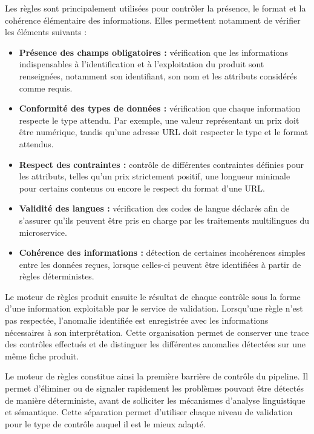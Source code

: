 Les règles sont principalement utilisées pour contrôler la présence, le format et la cohérence élémentaire des informations. Elles permettent notamment de vérifier les éléments suivants :
\newpage
\begin{itemize}
    \item \textbf{Présence des champs obligatoires :} vérification que les informations indispensables à l'identification et à l'exploitation du produit sont renseignées, notamment son identifiant, son nom et les attributs considérés comme requis.

    \item \textbf{Conformité des types de données :} vérification que chaque information respecte le type attendu. Par exemple, une valeur représentant un prix doit être numérique, tandis qu'une adresse URL doit respecter le type et le format attendus.

    \item \textbf{Respect des contraintes :} contrôle de différentes contraintes définies pour les attributs, telles qu'un prix strictement positif, une longueur minimale pour certains contenus ou encore le respect du format d'une URL.

    \item \textbf{Validité des langues :} vérification des codes de langue déclarés afin de s'assurer qu'ils peuvent être pris en charge par les traitements multilingues du microservice.

    \item \textbf{Cohérence des informations :} détection de certaines incohérences simples entre les données reçues, lorsque celles-ci peuvent être identifiées à partir de règles déterministes.
\end{itemize}

Le moteur de règles produit ensuite le résultat de chaque contrôle sous la forme d'une information exploitable par le service de validation. Lorsqu'une règle n'est pas respectée, l'anomalie identifiée est enregistrée avec les informations nécessaires à son interprétation. Cette organisation permet de conserver une trace des contrôles effectués et de distinguer les différentes anomalies détectées sur une même fiche produit.

Le moteur de règles constitue ainsi la première barrière de contrôle du pipeline. Il permet d'éliminer ou de signaler rapidement les problèmes pouvant être détectés de manière déterministe, avant de solliciter les mécanismes d'analyse linguistique et sémantique. Cette séparation permet d'utiliser chaque niveau de validation pour le type de contrôle auquel il est le mieux adapté.


